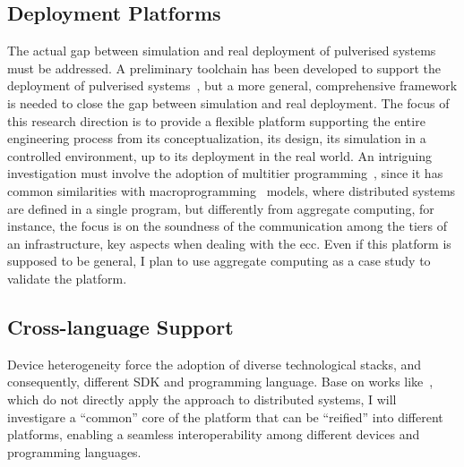 \documentclass[runningheads]{llncs}
\begin{document}
\subsection{Deployment Platforms}
The actual gap between simulation and real deployment of pulverised systems must be addressed.
%
A preliminary toolchain has been developed to support the deployment of pulverised systems~\cite{DBLP:journals/fgcs/FarabegoliPCV24,DBLP:conf/acsos/FarabegoliVC24},
but a more general,
comprehensive framework is needed to close the gap between simulation and real deployment.
%
The focus of this research direction is to provide a
flexible platform supporting the entire engineering process from its conceptualization,
its design,
its simulation in a controlled environment,
up to its deployment in the real world.
%
An intriguing investigation must involve the adoption of multitier programming~\cite{DBLP:journals/pacmpl/WeisenburgerKS18},
since it has common similarities with macroprogramming~\cite{DBLP:journals/csur/Casadei23} models,
where distributed systems are defined in a single program,
but differently from aggregate computing,
for instance,
the focus is on the soundness of the communication among the tiers of an infrastructure,
key aspects when dealing with the \ac{ecc}.
%
Even if this platform is supposed to be general,
I plan to use aggregate computing as a case study to validate the platform.

\subsection{Cross-language Support}
Device heterogeneity force the adoption of diverse technological stacks,
and consequently,
different SDK and programming language.
%
Base on works like~\cite{DBLP:journals/jss/BertolottiCOC24},
which do not directly apply the approach to distributed systems,
I will investigare a ``common'' core of the platform that can be ``reified'' into different platforms,
enabling a seamless interoperability among different devices and programming languages.
\end{document}
